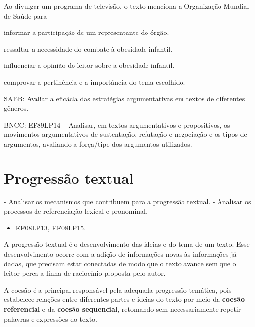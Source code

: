 Ao divulgar um programa de televisão, o texto menciona a Organização
Mundial de Saúde para

\begin{escolha}
\item informar a participação de um representante do órgão.

\item ressaltar a necessidade do combate à obesidade infantil.

\item influenciar a opinião do leitor sobre a obesidade infantil.

\item comprovar a pertinência e a importância do tema escolhido.
\end{escolha}

SAEB: Avaliar a eficácia das estratégias argumentativas em textos de
diferentes gêneros.

BNCC: EF89LP14 -- Analisar, em textos argumentativos e propositivos, os
movimentos argumentativos de sustentação, refutação e negociação e os
tipos de argumentos, avaliando a força/tipo dos argumentos utilizados.

\chapter{Progressão textual}

 - Analisar os mecanismos que contribuem
para a progressão textual. - Analisar os processos de referenciação
lexical e pronominal.


\begin{itemize}
\tightlist
\item
  EF08LP13, EF08LP15.
\end{itemize}

A progressão textual é o desenvolvimento das ideias e do tema de um
texto. Esse desenvolvimento ocorre com a adição de informações novas às
informações já dadas, que precisam estar conectadas de modo que o texto
avance sem que o leitor perca a linha de raciocínio proposta pelo autor.

A coesão é a principal responsável pela adequada progressão temática,
pois estabelece relações entre diferentes partes e ideias do texto por
meio da \textbf{coesão referencial} e da \textbf{coesão sequencial},
retomando sem necessariamente repetir palavras e expressões do texto.

